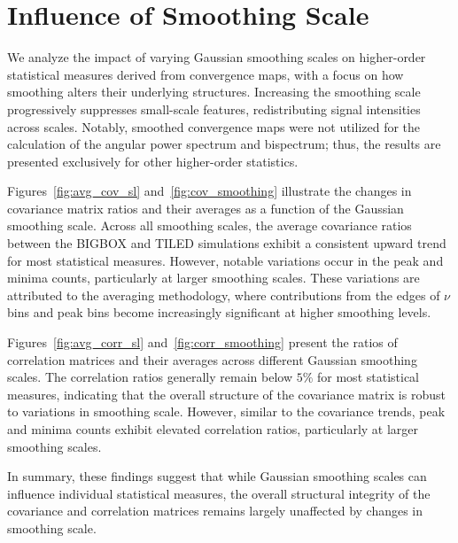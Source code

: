 \clearpage

\section{Influence of Smoothing Scale}
We analyze the impact of varying Gaussian smoothing scales on higher-order statistical measures derived from convergence maps, with a focus on how smoothing alters their underlying structures. Increasing the smoothing scale progressively suppresses small-scale features, redistributing signal intensities across scales. Notably, smoothed convergence maps were not utilized for the calculation of the angular power spectrum and bispectrum; thus, the results are presented exclusively for other higher-order statistics.

Figures~\ref{fig:avg_cov_sl} and~\ref{fig:cov_smoothing} illustrate the changes in covariance matrix ratios and their averages as a function of the Gaussian smoothing scale. Across all smoothing scales, the average covariance ratios between the BIGBOX and TILED simulations exhibit a consistent upward trend for most statistical measures. However, notable variations occur in the peak and minima counts, particularly at larger smoothing scales. These variations are attributed to the averaging methodology, where contributions from the edges of $\nu$ bins and peak bins become increasingly significant at higher smoothing levels.

Figures~\ref{fig:avg_corr_sl} and~\ref{fig:corr_smoothing} present the ratios of correlation matrices and their averages across different Gaussian smoothing scales. The correlation ratios generally remain below $5\%$ for most statistical measures, indicating that the overall structure of the covariance matrix is robust to variations in smoothing scale. However, similar to the covariance trends, peak and minima counts exhibit elevated correlation ratios, particularly at larger smoothing scales.

In summary, these findings suggest that while Gaussian smoothing scales can influence individual statistical measures, the overall structural integrity of the covariance and correlation matrices remains largely unaffected by changes in smoothing scale.

